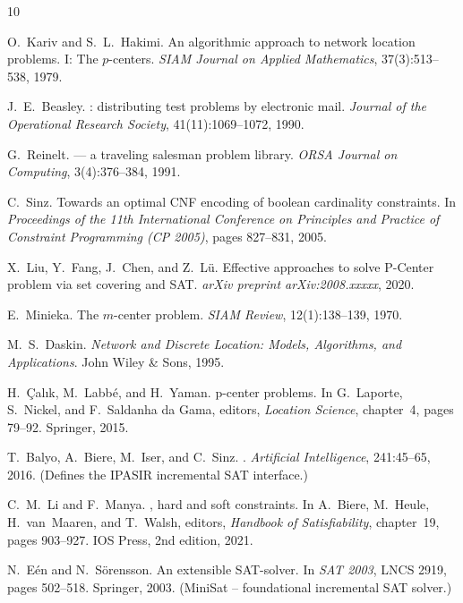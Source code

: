 \documentclass[11pt,a4paper]{article}
\begin{document}

\begin{thebibliography}{10}

O.~Kariv and S.~L.~Hakimi.
\newblock An algorithmic approach to network location problems. {I}: The $p$-centers.
\newblock \emph{SIAM Journal on Applied Mathematics}, 37(3):513--538, 1979.

J.~E.~Beasley.
: distributing test problems by electronic mail.
\newblock \emph{Journal of the Operational Research Society}, 41(11):1069--1072, 1990.

G.~Reinelt.
 --- a traveling salesman problem library.
\newblock \emph{ORSA Journal on Computing}, 3(4):376--384, 1991.

C.~Sinz.
\newblock Towards an optimal {CNF} encoding of boolean cardinality constraints.
\newblock In \emph{Proceedings of the 11th International Conference on Principles and Practice of Constraint Programming (CP 2005)}, pages 827--831, 2005.

X.~Liu, Y.~Fang, J.~Chen, and Z.~L{\"u}.
\newblock Effective approaches to solve {P-Center} problem via set covering and {SAT}.
\newblock \emph{arXiv preprint arXiv:2008.xxxxx}, 2020.

E.~Minieka.
\newblock The $m$-center problem.
\newblock \emph{SIAM Review}, 12(1):138--139, 1970.

M.~S.~Daskin.
\newblock \emph{Network and Discrete Location: Models, Algorithms, and Applications}.
\newblock John Wiley \& Sons, 1995.

H.~\c{C}al{\i}k, M.~Labb\'e, and H.~Yaman.
\newblock p-center problems.
\newblock In G.~Laporte, S.~Nickel, and F.~Saldanha da Gama, editors, \emph{Location Science}, chapter~4, pages 79--92. Springer, 2015.

T.~Balyo, A.~Biere, M.~Iser, and C.~Sinz.
.
\newblock \emph{Artificial Intelligence}, 241:45--65, 2016.
\newblock (Defines the IPASIR incremental SAT interface.)

C.~M.~Li and F.~Manya.
, hard and soft constraints.
\newblock In A.~Biere, M.~Heule, H.~van~Maaren, and T.~Walsh, editors, \emph{Handbook of Satisfiability}, chapter~19, pages 903--927. IOS Press, 2nd edition, 2021.

N.~E{\'e}n and N.~S{\"o}rensson.
\newblock An extensible {SAT}-solver.
\newblock In \emph{SAT 2003}, LNCS 2919, pages 502--518. Springer, 2003.
\newblock (MiniSat -- foundational incremental SAT solver.)

\end{thebibliography}
\end{document}
